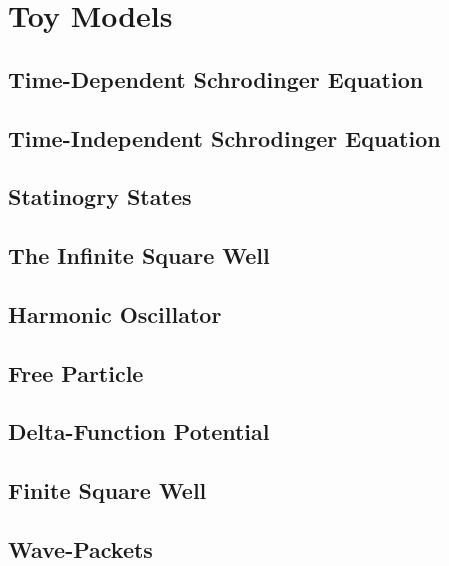 \chapter{Toy Models}
\section{Time-Dependent Schrodinger Equation}
\section{Time-Independent Schrodinger Equation}
\section{Statinogry States}
\section{The Infinite Square Well}
\section{Harmonic Oscillator}
\section{Free Particle}
\section{Delta-Function Potential}
\section{Finite Square Well}
\section{Wave-Packets}
